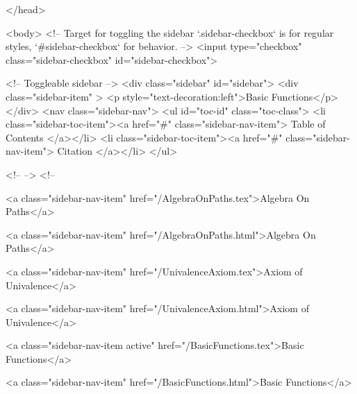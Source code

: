   
</head>




  <body>
    <!-- Target for toggling the sidebar `.sidebar-checkbox` is for regular
     styles, `#sidebar-checkbox` for behavior. -->
<input type="checkbox" class="sidebar-checkbox" id="sidebar-checkbox">

<!-- Toggleable sidebar -->
<div class="sidebar" id="sidebar">
  <div class="sidebar-item" >
    <p style="text-decoration:left">Basic Functions</p>
  </div>
  <nav class="sidebar-nav">
    <ul id="toc-id" class="toc-class">
  <li class="sidebar-toc-item"><a href="#" class="sidebar-nav-item"> Table of Contents </a></li>
  <li class="sidebar-toc-item"><a href="#" class="sidebar-nav-item"> Citation </a></li>
</ul>


    <!--  -->
    <!-- 
      
    
      
    
      
    
      
        
      
    
      
        
          <a class="sidebar-nav-item" href="/AlgebraOnPaths.tex">Algebra On Paths</a>
        
      
    
      
        
          <a class="sidebar-nav-item" href="/AlgebraOnPaths.html">Algebra On Paths</a>
        
      
    
      
        
          <a class="sidebar-nav-item" href="/UnivalenceAxiom.tex">Axiom of Univalence</a>
        
      
    
      
        
          <a class="sidebar-nav-item" href="/UnivalenceAxiom.html">Axiom of Univalence</a>
        
      
    
      
        
          <a class="sidebar-nav-item active" href="/BasicFunctions.tex">Basic Functions</a>
        
      
    
      
        
          <a class="sidebar-nav-item" href="/BasicFunctions.html">Basic Functions</a>
        
      
    
      
        
